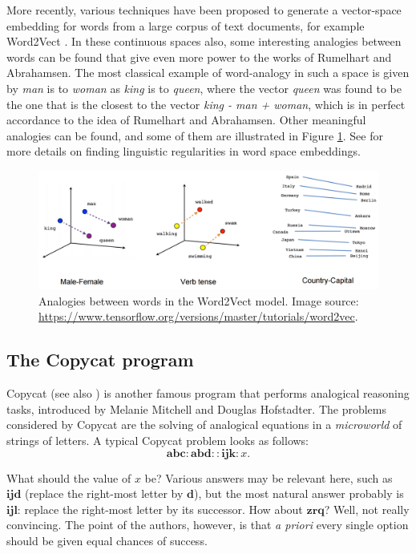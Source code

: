 More recently, various techniques have been proposed to generate a vector-space
embedding for words from a large corpus of text documents, for example
Word2Vect \cite{MikCheCorDea13}. In these continuous spaces also, some
interesting analogies between words can be found that give even more power to
the works of Rumelhart and Abrahamsen. The most classical example of
word-analogy in such a space is given by \textit{man} is to \textit{woman} as
\textit{king} is to \textit{queen}, where the vector
\textit{queen} was found to be the one that is the closest to the vector
\textit{king - man + woman}, which is in perfect accordance to the idea of
Rumelhart and Abrahamsen. Other meaningful analogies can be found, and some of
them are illustrated in Figure \ref{FIG:word_analogies}. See \cite{MikYihZwe13}
for more details on finding linguistic regularities in word space embeddings.
\begin{figure}[!h]
\centering
  \includegraphics[width=5in]{figures/word_analogies.png}
\caption{Analogies between words in the Word2Vect model. Image source:
  \url{https://www.tensorflow.org/versions/master/tutorials/word2vec}.}
  \label{FIG:word_analogies}
\end{figure}


\subsection{The Copycat program}
\label{SEC:copycat}

Copycat \cite{Mit93} (see also \cite{HofMit94}) is another famous program that
performs analogical reasoning tasks, introduced by Melanie Mitchell and Douglas
Hofstadter. The problems considered by Copycat are the solving of analogical
equations in a \textit{microworld} of strings of letters. A typical Copycat
problem looks as follows:
$$\mathbf{abc} : \mathbf{abd} :: \mathbf{ijk} : x.$$

What should the value of $x$ be? Various answers may be relevant here, such as
$\mathbf{ijd}$ (replace the right-most letter by $\mathbf{d}$), but the most
natural answer probably is $\mathbf{ijl}$: replace the right-most letter by its
successor. How about $\mathbf{zrq}$? Well, not really convincing. The point of
the authors, however, is that \textit{a priori} every single option should be
given equal chances of success.

